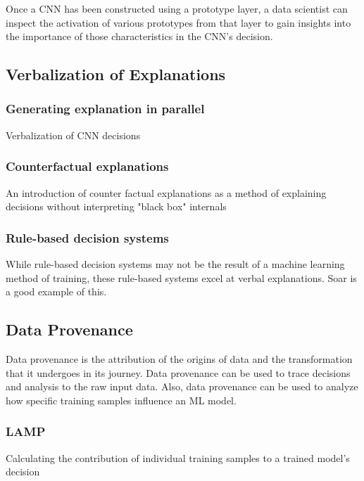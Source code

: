 \documentclass{IEEEtran}
\begin{document}
Once a CNN has been constructed using a prototype layer, a data scientist can inspect the activation of various prototypes from that layer to gain insights into the importance of those characteristics in the CNN's decision.

\subsection{Verbalization of Explanations}

\subsubsection{Generating explanation in parallel}

Verbalization of CNN decisions \cite{10.1007/978-3-319-46493-0_1}

\subsubsection{Counterfactual explanations}

An introduction of counter factual explanations as a method of explaining decisions without interpreting "black box" internals \cite{DBLP:journals/corr/abs-1711-00399}

\subsubsection{Rule-based decision systems}

While rule-based decision systems may not be the result of a machine learning method of training, these rule-based systems excel at verbal explanations.  Soar is a good example of this.

\subsection{Data Provenance}

Data provenance is the attribution of the origins of data and the transformation that it undergoes in its journey.  Data provenance can be used to trace decisions and analysis to the raw input data.  Also, data provenance can be used to analyze how specific training samples influence an ML model.

\subsubsection{LAMP}

Calculating the contribution of individual training samples to a trained model's decision \cite{Ma2017}
\end{document}

